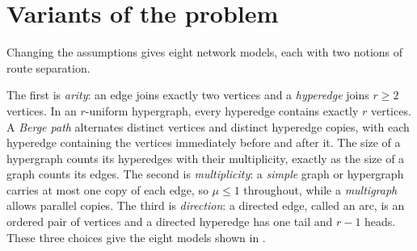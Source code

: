 \section{Variants of the problem}

Changing the assumptions gives eight network models, each with two notions of route separation.

The first is \emph{arity}: an edge joins exactly two vertices and a \emph{hyperedge} joins $r \ge 2$ vertices.
In an $r$-uniform hypergraph, every hyperedge contains exactly $r$ vertices. A \emph{Berge path} alternates distinct vertices and distinct hyperedge copies, with each hyperedge containing the vertices immediately before and after it.
The size of a hypergraph counts its hyperedges with their multiplicity, exactly as the size of a graph counts its edges.
The second is \emph{multiplicity}: a \emph{simple} graph or hypergraph carries at most one copy of each edge, so $\mu \le 1$ throughout, while a \emph{multigraph} allows parallel copies.
The third is \emph{direction}: a directed edge, called an arc, is an ordered pair of vertices and a directed hyperedge has one tail and $r-1$ heads.
These three choices give the eight models shown in .

